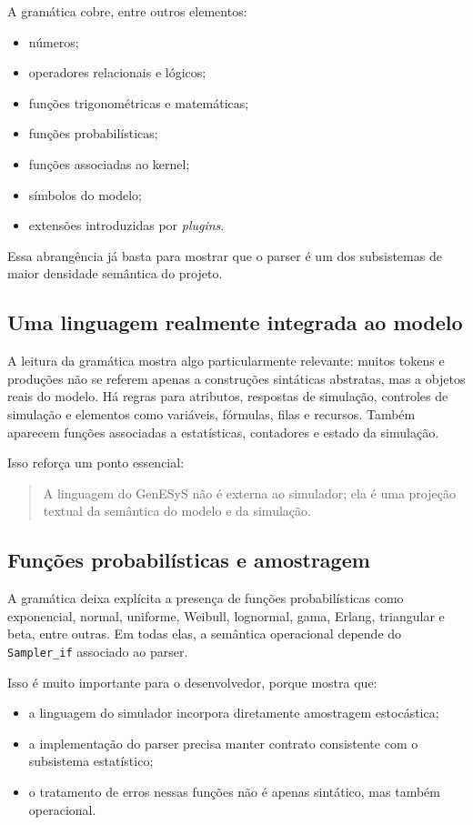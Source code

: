 A gramática cobre, entre outros elementos:
\begin{itemize}
    \item números;
    \item operadores relacionais e lógicos;
    \item funções trigonométricas e matemáticas;
    \item funções probabilísticas;
    \item funções associadas ao kernel;
    \item símbolos do modelo;
    \item extensões introduzidas por \textit{plugins}.
\end{itemize}

Essa abrangência já basta para mostrar que o parser é um dos subsistemas de maior densidade semântica do projeto.

\subsection{Uma linguagem realmente integrada ao modelo}
\label{subsec:cap9_linguagem_integrada_modelo}

A leitura da gramática mostra algo particularmente relevante: muitos tokens e produções não se referem apenas a construções sintáticas abstratas, mas a objetos reais do modelo. Há regras para atributos, respostas de simulação, controles de simulação e elementos como variáveis, fórmulas, filas e recursos. Também aparecem funções associadas a estatísticas, contadores e estado da simulação.

Isso reforça um ponto essencial:
\begin{quote}
    A linguagem do GenESyS não é externa ao simulador; ela é uma projeção textual da semântica do modelo e da simulação.
\end{quote}

\subsection{Funções probabilísticas e amostragem}
\label{subsec:cap9_funcoes_probabilisticas_amostragem}

A gramática deixa explícita a presença de funções probabilísticas como exponencial, normal, uniforme, Weibull, lognormal, gama, Erlang, triangular e beta, entre outras. Em todas elas, a semântica operacional depende do \texttt{Sampler\_if} associado ao parser.

Isso é muito importante para o desenvolvedor, porque mostra que:
\begin{itemize}
    \item a linguagem do simulador incorpora diretamente amostragem estocástica;
    \item a implementação do parser precisa manter contrato consistente com o subsistema estatístico;
    \item o tratamento de erros nessas funções não é apenas sintático, mas também operacional.
\end{itemize}

